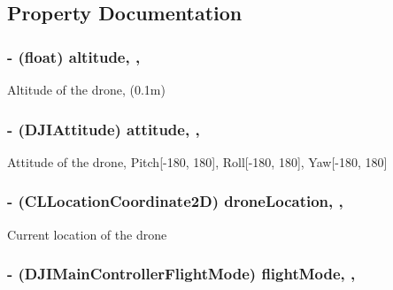 \subsection{Property Documentation}
\hypertarget{interface_d_j_i_m_c_system_state_a14fa4428eae3c3c96789a44d41d0a8d8}{
\subsubsection[{altitude}]{\setlength{\rightskip}{0pt plus 5cm}-\/ (float) altitude\hspace{0.3cm}{\ttfamily [read]}, {\ttfamily [nonatomic]}, {\ttfamily [assign]}}}\label{interface_d_j_i_m_c_system_state_a14fa4428eae3c3c96789a44d41d0a8d8}
Altitude of the drone, (0.\+1m) \hypertarget{interface_d_j_i_m_c_system_state_af6916800ba242ddaa3ede17625224021}{
\subsubsection[{attitude}]{\setlength{\rightskip}{0pt plus 5cm}-\/ ({\bf D\+J\+I\+Attitude}) attitude\hspace{0.3cm}{\ttfamily [read]}, {\ttfamily [nonatomic]}, {\ttfamily [assign]}}}\label{interface_d_j_i_m_c_system_state_af6916800ba242ddaa3ede17625224021}
Attitude of the drone, Pitch\mbox{[}-\/180, 180\mbox{]}, Roll\mbox{[}-\/180, 180\mbox{]}, Yaw\mbox{[}-\/180, 180\mbox{]} \hypertarget{interface_d_j_i_m_c_system_state_a90f991829772ba3e7bb23811845fb2cc}{
\subsubsection[{drone\+Location}]{\setlength{\rightskip}{0pt plus 5cm}-\/ (C\+L\+Location\+Coordinate2\+D) drone\+Location\hspace{0.3cm}{\ttfamily [read]}, {\ttfamily [nonatomic]}, {\ttfamily [assign]}}}\label{interface_d_j_i_m_c_system_state_a90f991829772ba3e7bb23811845fb2cc}
Current location of the drone \hypertarget{interface_d_j_i_m_c_system_state_a7ecc5f31a38b34a94f6680f7fc6f590c}{
\subsubsection[{flight\+Mode}]{\setlength{\rightskip}{0pt plus 5cm}-\/ (D\+J\+I\+Main\+Controller\+Flight\+Mode) flight\+Mode\hspace{0.3cm}{\ttfamily [read]}, {\ttfamily [nonatomic]}, {\ttfamily [assign]}}}\label{interface_d_j_i_m_c_system_state_a7ecc5f31a38b34a94f6680f7fc6f590c}

